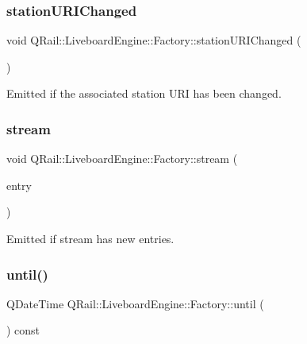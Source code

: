 \subsubsection{\texorpdfstring{stationURIChanged}{stationURIChanged}}
{\footnotesize\ttfamily void Q\+Rail\+::\+Liveboard\+Engine\+::\+Factory\+::station\+U\+R\+I\+Changed (\begin{DoxyParamCaption}{ }\end{DoxyParamCaption})\hspace{0.3cm}{\ttfamily [signal]}}



Emitted if the associated station U\+RI has been changed. 

\mbox{\label{classQRail_1_1LiveboardEngine_1_1Factory_a554a8d4a9cdd0e0306763a003036ef93}} 
\subsubsection{\texorpdfstring{stream}{stream}}
{\footnotesize\ttfamily void Q\+Rail\+::\+Liveboard\+Engine\+::\+Factory\+::stream (\begin{DoxyParamCaption}\item[{\mbox{\hyperlink{classQRail_1_1VehicleEngine_1_1Vehicle}{Q\+Rail\+::\+Vehicle\+Engine\+::\+Vehicle}} $\ast$}]{entry }\end{DoxyParamCaption})\hspace{0.3cm}{\ttfamily [signal]}}



Emitted if stream has new entries. 

\mbox{\label{classQRail_1_1LiveboardEngine_1_1Factory_a040529d305e2cc4d19b68f48817f7a90}} 
\subsubsection{\texorpdfstring{until()}{until()}}
{\footnotesize\ttfamily Q\+Date\+Time Q\+Rail\+::\+Liveboard\+Engine\+::\+Factory\+::until (\begin{DoxyParamCaption}{ }\end{DoxyParamCaption}) const}



